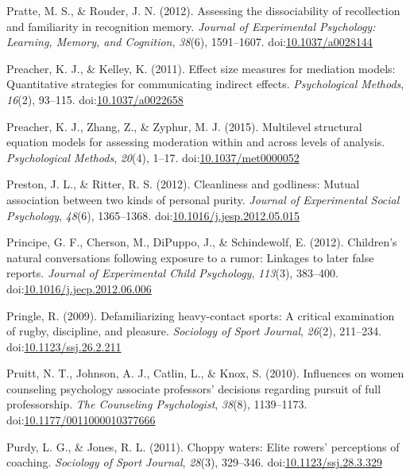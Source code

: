 \documentclass[english,man]{apa6}
\theoremstyle{definition}
\theoremstyle{definition}
\theoremstyle{definition}
\theoremstyle{remark}
\begin{document}
\hypertarget{ref-Pratte2012}{}
Pratte, M. S., \& Rouder, J. N. (2012). Assessing the dissociability of
recollection and familiarity in recognition memory. \emph{Journal of
Experimental Psychology: Learning, Memory, and Cognition}, \emph{38}(6),
1591--1607.
doi:\href{https://doi.org/10.1037/a0028144}{10.1037/a0028144}

\hypertarget{ref-Preacher2011}{}
Preacher, K. J., \& Kelley, K. (2011). Effect size measures for
mediation models: Quantitative strategies for communicating indirect
effects. \emph{Psychological Methods}, \emph{16}(2), 93--115.
doi:\href{https://doi.org/10.1037/a0022658}{10.1037/a0022658}

\hypertarget{ref-Preacher2015}{}
Preacher, K. J., Zhang, Z., \& Zyphur, M. J. (2015). Multilevel
structural equation models for assessing moderation within and across
levels of analysis. \emph{Psychological Methods}, \emph{20}(4), 1--17.
doi:\href{https://doi.org/10.1037/met0000052}{10.1037/met0000052}

\hypertarget{ref-Preston2012}{}
Preston, J. L., \& Ritter, R. S. (2012). Cleanliness and godliness:
Mutual association between two kinds of personal purity. \emph{Journal
of Experimental Social Psychology}, \emph{48}(6), 1365--1368.
doi:\href{https://doi.org/10.1016/j.jesp.2012.05.015}{10.1016/j.jesp.2012.05.015}

\hypertarget{ref-Principe2012}{}
Principe, G. F., Cherson, M., DiPuppo, J., \& Schindewolf, E. (2012).
Children's natural conversations following exposure to a rumor: Linkages
to later false reports. \emph{Journal of Experimental Child Psychology},
\emph{113}(3), 383--400.
doi:\href{https://doi.org/10.1016/j.jecp.2012.06.006}{10.1016/j.jecp.2012.06.006}

\hypertarget{ref-Pringle2009}{}
Pringle, R. (2009). Defamiliarizing heavy-contact sports: A critical
examination of rugby, discipline, and pleasure. \emph{Sociology of Sport
Journal}, \emph{26}(2), 211--234.
doi:\href{https://doi.org/10.1123/ssj.26.2.211}{10.1123/ssj.26.2.211}

\hypertarget{ref-Pruitt2010}{}
Pruitt, N. T., Johnson, A. J., Catlin, L., \& Knox, S. (2010).
Influences on women counseling psychology associate professors'
decisions regarding pursuit of full professorship. \emph{The Counseling
Psychologist}, \emph{38}(8), 1139--1173.
doi:\href{https://doi.org/10.1177/0011000010377666}{10.1177/0011000010377666}

\hypertarget{ref-Purdy2011}{}
Purdy, L. G., \& Jones, R. L. (2011). Choppy waters: Elite rowers'
perceptions of coaching. \emph{Sociology of Sport Journal},
\emph{28}(3), 329--346.
doi:\href{https://doi.org/10.1123/ssj.28.3.329}{10.1123/ssj.28.3.329}
\end{document}

